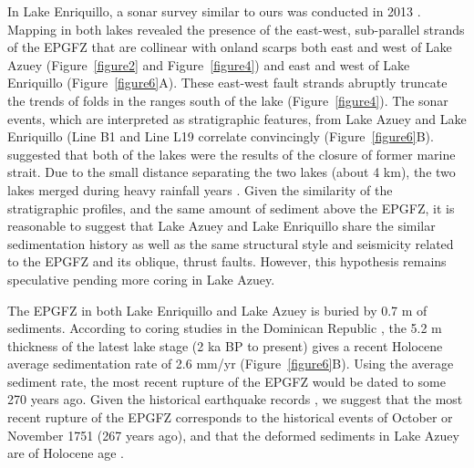 \documentclass[linenumbers,draft]{agujournal}
\begin{document}
In Lake Enriquillo, a sonar survey similar to ours was conducted in 2013 \citep{rios2013holocene}. Mapping in both lakes revealed the presence of the east-west, sub-parallel strands of the EPGFZ that are collinear with onland scarps both east and west of Lake Azuey (Figure~\ref{figure2} and Figure~\ref{figure4}) and east and west of Lake Enriquillo \citep{mann1995actively,rios2013holocene} (Figure~\ref{figure6}A). These east-west fault strands abruptly truncate the trends of folds in the ranges south of the lake (Figure~\ref{figure4}). The sonar events, which are interpreted as stratigraphic features, from Lake Azuey and Lake Enriquillo (Line B1 and Line L19 correlate convincingly (Figure~\ref{figure6}B). \citet{schwartz1980herpetogeography} suggested that both of the lakes were the results of the closure of former marine strait. Due to the small distance separating the two lakes (about 4 km), the two lakes merged during heavy rainfall years \citep{greer2006decadal,medley2007paleosalinity,romero2011water}. Given the similarity of the stratigraphic profiles, and the same amount of sediment above the EPGFZ, it is reasonable to suggest that Lake Azuey and Lake Enriquillo share the similar sedimentation history as well as the same structural style and seismicity related to the EPGFZ and its oblique, thrust faults. However, this hypothesis remains speculative pending more coring in Lake Azuey.

The EPGFZ in both Lake Enriquillo and Lake Azuey is buried by 0.7 m of sediments. According to coring studies in the Dominican Republic \citep{taylor1985stratigraphy,rios2013holocene}, the 5.2 m thickness of the latest lake stage (2 ka BP to present) gives a recent Holocene average sedimentation rate of 2.6 mm/yr (Figure~\ref{figure6}B). Using the average sediment rate, the most recent rupture of the EPGFZ would be dated to some 270 years ago. Given the historical earthquake records \citep{bakun2012significant}, we suggest that the most recent rupture of the EPGFZ corresponds to the historical events of October or November 1751 (267 years ago), and that the deformed sediments in Lake Azuey are of Holocene age \citep{rios2013holocene}.
\end{document}
